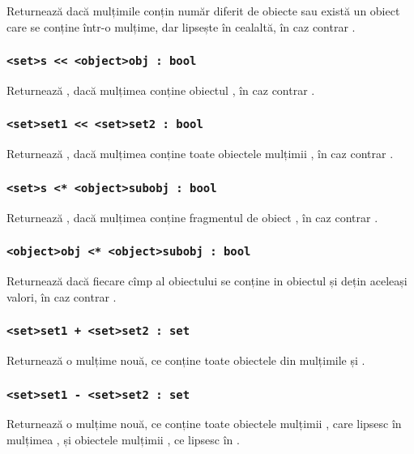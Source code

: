 Returnează \true{} dacă mulțimile conțin număr diferit de obiecte sau există un obiect care se conține într-o mulțime, dar lipsește în cealaltă, în caz contrar \false{}.

\subsubsection{\lstinline|<set>s << <object>obj : bool|}

Returnează \true{}, dacă mulțimea  conține obiectul , în caz contrar \false{}.

\subsubsection{\lstinline|<set>set1 << <set>set2 : bool|}

Returnează \true, dacă mulțimea  conține toate obiectele mulțimii , în caz contrar \false.

\subsubsection{\lstinline|<set>s <* <object>subobj : bool|}

Returnează \true{}, dacă mulțimea  conține fragmentul de obiect , în caz contrar \false{}.

\subsubsection{\lstinline|<object>obj <* <object>subobj : bool|}

Returnează \true{} dacă fiecare cîmp al obiectului  se conține in obiectul  și dețin aceleași valori, în caz contrar \false{}.

\subsubsection{\lstinline|<set>set1 + <set>set2 : set|}

Returnează o mulțime nouă, ce conține toate obiectele din mulțimile  și .

\subsubsection{\lstinline|<set>set1 - <set>set2 : set|}

Returnează o mulțime nouă, ce conține toate obiectele mulțimii , care lipsesc în mulțimea , și obiectele mulțimii , ce lipsesc în .

